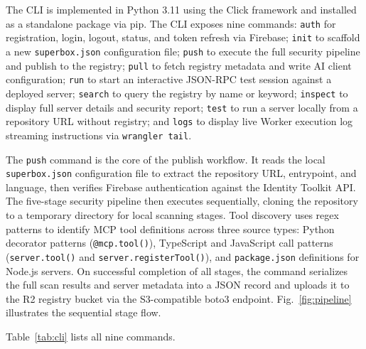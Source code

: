 \documentclass[conference]{IEEEtran}
\begin{document}
The CLI is implemented in Python 3.11 using the Click framework
and installed as a standalone package via pip.
The CLI exposes nine commands: \texttt{auth} for registration, login,
logout, status, and token refresh via Firebase; \texttt{init} to
scaffold a new \texttt{superbox.json} configuration file; \texttt{push}
to execute the full security pipeline and publish to the registry;
\texttt{pull} to fetch registry metadata and write AI client
configuration; \texttt{run} to start an interactive JSON-RPC test
session against a deployed server; \texttt{search} to query the
registry by name or keyword; \texttt{inspect} to display full server
details and security report; \texttt{test} to run a server locally from
a repository URL without registry; and \texttt{logs} to display live
Worker execution log streaming instructions via \texttt{wrangler~tail}.

The \texttt{push} command is the core of the publish workflow.
It reads the local \texttt{superbox.json} configuration file to extract
the repository URL, entrypoint, and language, then verifies Firebase
authentication against the Identity Toolkit API.
The five-stage security pipeline then executes sequentially, cloning
the repository to a temporary directory for local scanning stages.
Tool discovery uses regex patterns to identify MCP tool definitions
across three source types: Python decorator patterns
(\texttt{@mcp.tool()}), TypeScript and JavaScript call patterns
(\texttt{server.tool()} and \texttt{server.registerTool()}), and
\texttt{package.json} definitions for Node.js servers.
On successful completion of all stages, the command serializes the full
scan results and server metadata into a JSON record and uploads it to
the R2 registry bucket via the S3-compatible boto3 endpoint.
Fig.~\ref{fig:pipeline} illustrates the sequential stage flow.

Table~\ref{tab:cli} lists all nine commands.
\end{document}
